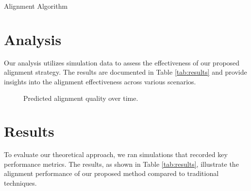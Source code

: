 \begin{algorithm}[H]
\caption{Alignment Algorithm}
\end{algorithm}

\section{Analysis}
Our analysis utilizes simulation data to assess the effectiveness of our proposed alignment strategy. The results are documented in Table \ref{tab:results} and provide insights into the alignment effectiveness across various scenarios.

\begin{figure}[h]
    \centering
    \begin{adjustbox}{width=\linewidth}
    \end{adjustbox}
    \caption{Predicted alignment quality over time.}
    \label{fig:alignment_curve}
\end{figure}

\section{Results}
To evaluate our theoretical approach, we ran simulations that recorded key performance metrics. The results, as shown in Table \ref{tab:results}, illustrate the alignment performance of our proposed method compared to traditional techniques.

\begin{table}[h]
\centering
{}
\caption{Simulation results of alignment techniques.}
\label{tab:results}
\end{table}

